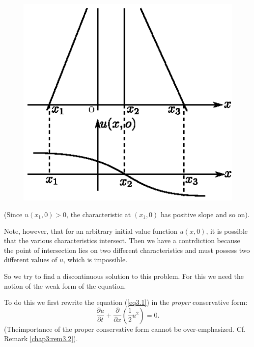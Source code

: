 \begin{figure}[H]
\centering
\includegraphics{figures/fig52-3.1.eps}
\caption{}\label{c3:fig3.1}
\end{figure}\pageoriginale

(Since $u(x_1, 0) > 0$, the characteristic at $(x_1, 0)$ has
positive slope and so on).

Note, however, that for an arbitrary initial value function
$u(x,0)$, it is possible that the various characteristics
intersect. Then we have a contrdiction because the point of
intersection lies on two different characteristics and must possess
two different values of $u$, which is impossible.

So we try to find a discontinuous solution to this problem. For this
we need the notion of the weak form of the equation.

To do this we first rewrite the equation (\ref{eq3.1}) in the {\em proper}
conservative form:
\begin{equation*}
\frac{\partial u}{\partial t} + \frac{\partial}{\partial x}
\left(\frac{1}{2} u^2\right) = 0. 
\tag{3.5}\label{eq3.5}
\end{equation*}
(The\pageoriginale importance of the proper conservative form cannot
be over-\break emphasized. Cf. Remark \ref{chap3:rem3.2}).

